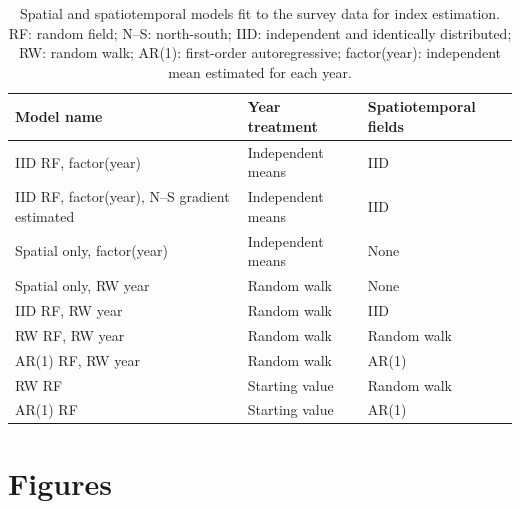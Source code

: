 \documentclass[11pt]{article}
\begin{document}
\begin{table}[htpb]
\centering
\caption{Spatial and spatiotemporal models fit to the survey data for index estimation. RF: random field; N--S: north-south; IID: independent and identically distributed; RW: random walk; AR(1): first-order autoregressive; factor(year): independent mean estimated for each year.}
\label{tab:model-scenarios}
\begin{tabular}{@{}lll@{}}
\toprule
Model name                                    & Year treatment     & Spatiotemporal fields \\
\midrule
IID RF, factor(year)                          & Independent means  & IID \\
IID RF, factor(year), N--S gradient estimated  & Independent means  & IID  \\
Spatial only, factor(year)                    & Independent means  & None \\
Spatial only, RW year                         & Random walk        & None  \\
IID RF, RW year                               & Random walk        & IID \\
RW RF, RW year                                & Random walk        & Random walk \\
AR(1) RF, RW year                             & Random walk        & AR(1) \\
RW RF                                         & Starting value     & Random walk \\
AR(1) RF                                      & Starting value     & AR(1) \\
\bottomrule
\end{tabular}
\end{table}

\clearpage


\section*{Figures}

\end{document}
